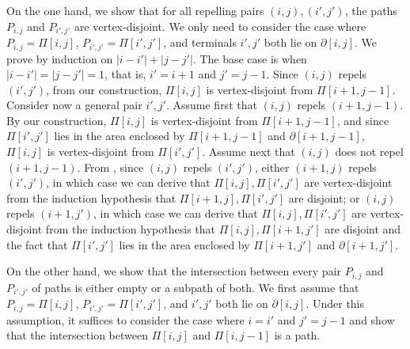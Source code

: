 \documentclass[11pt]{article}
\begin{document}
On the one hand, we show that for all repelling pairs $(i,j), (i',j')$, the paths $P_{i,j}$ and $P_{i',j'}$ are vertex-disjoint. 
We only need to consider the case where $P_{i,j}=\Pi[i,j]$, $P_{i',j'}=\Pi[i',j']$, and terminals  $i',j'$ both lie on $\partial[i,j]$. 
We prove by induction on $|i-i'|+|j-j'|$. The base case is when $|i-i'|=|j-j'|=1$, that is, $i'=i+1$ and $j'=j-1$. Since $(i,j)$ repels $(i',j')$, from our construction, $\Pi[i,j]$ is vertex-disjoint from $\Pi[i+1,j-1]$.
Consider now a general pair $i',j'$.
Assume first that $(i,j)$ repels $(i+1,j-1)$. By our construction, $\Pi[i,j]$ is vertex-disjoint from $\Pi[i+1,j-1]$, and since $\Pi[i',j']$ lies in the area enclosed by $\Pi[i+1,j-1]$ and $\partial[i+1,j-1]$, $\Pi[i,j]$ is vertex-disjoint from $\Pi[i',j']$. Assume next that $(i,j)$ does not repel $(i+1,j-1)$. From , since $(i,j)$ repels $(i',j')$, either $(i+1,j)$ repels $(i',j')$, in which case we can derive that $\Pi[i,j],\Pi[i',j']$ are vertex-disjoint from the induction hypothesis that $\Pi[i+1,j],\Pi[i',j']$ are disjoint; 
or $(i,j)$ repels $(i+1,j')$, in which case we can derive that 
$\Pi[i,j],\Pi[i',j']$ are vertex-disjoint from the induction hypothesis that $\Pi[i,j],\Pi[i+1,j']$ are disjoint and the fact that $\Pi[i',j']$ lies in the area enclosed by $\Pi[i+1,j']$ and $\partial[i+1,j']$.

On the other hand, we show that the intersection between every pair $P_{i,j}$ and $P_{i',j'}$ of paths is either empty or a subpath of both. We first assume that $P_{i,j}=\Pi[i,j]$, $P_{i',j'}=\Pi[i',j']$, and $i',j'$ both lie on $\partial[i,j]$. Under this assumption, it suffices to consider the case where $i=i'$ and $j'=j-1$ and show that the intersection between $\Pi[i,j]$ and $\Pi[i,j-1]$ is a path.
\end{document}
